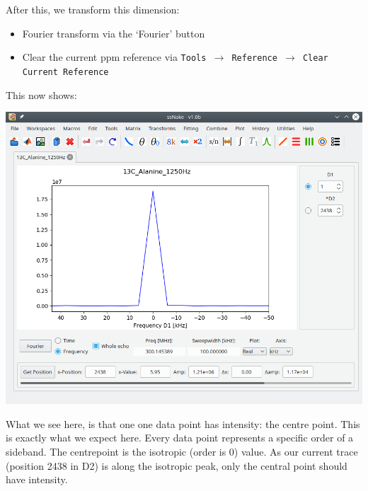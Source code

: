 \documentclass[11pt,a4paper]{article}
\begin{document}
After this, we transform this dimension:
\begin{itemize}
  \item Fourier transform via the `Fourier' button
  \item Clear the current ppm reference via \texttt{Tools $\longrightarrow$ Reference
	 $\longrightarrow$ Clear Current Reference}
\end{itemize}
This now shows:
\begin{center}
\includegraphics[width=0.8\linewidth]{Figs/Fig3.png}
\end{center}
What we see here, is that one one data point has intensity: the centre point.
This is exactly what we expect here.
Every data point represents a specific order of a sideband.
The centrepoint is the isotropic (order is 0) value.
As our current trace (position 2438 in D2) is along the isotropic peak, only the central point should have intensity.
\end{document}
